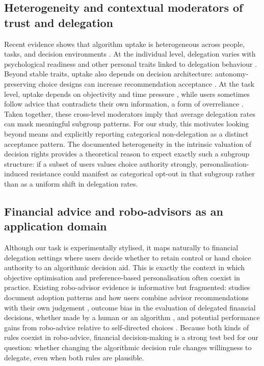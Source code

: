 \documentclass[a4paper, 12pt, fleqn]{article}
\theoremstyle{hypstyle}
\begin{document}
\subsection{Heterogeneity and contextual moderators of trust and delegation}
Recent evidence shows that algorithm uptake is heterogeneous across people, tasks, and decision environments \citep{Ferraz2025,Yang2025}. At the individual level, delegation varies with psychological readiness and other personal traits linked to delegation behaviour \citep{Kim2026,Ferraz2025}. Beyond stable traits, uptake also depends on decision architecture: autonomy-preserving choice designs can increase recommendation acceptance \citep{Fink2024}. At the task level, uptake depends on objectivity and time pressure \citep{Yang2025}, while users sometimes follow advice that contradicts their own information, a form of overreliance \citep{Klingbeil2024}. Taken together, these cross-level moderators imply that average delegation rates can mask meaningful subgroup patterns. For our study, this motivates looking beyond means and explicitly reporting categorical non-delegation as a distinct acceptance pattern. The documented heterogeneity in the intrinsic valuation of decision rights \citep{Bartling2014,Owens2014} provides a theoretical reason to expect exactly such a subgroup structure: if a subset of users values choice authority strongly, personalisation-induced resistance could manifest as categorical opt-out in that subgroup rather than as a uniform shift in delegation rates.

\subsection{Financial advice and robo-advisors as an application domain}
Although our task is experimentally stylised, it maps naturally to financial delegation settings where users decide whether to retain control or hand choice authority to an algorithmic decision aid. This is exactly the context in which objective optimisation and preference-based personalisation often coexist in practice. Existing robo-advisor evidence is informative but fragmented: studies document adoption patterns and how users combine advisor recommendations with their own judgement \citep{Figa-Talamanca2022,Mahmud2025}, outcome bias in the evaluation of delegated financial decisions, whether made by a human or an algorithm \citep{Ismagilova2025}, and potential performance gains from robo-advice relative to self-directed choices \citep{Lambrecht2023}. 
Because both kinds of rules coexist in robo-advice, financial decision-making is a strong test bed for our question: whether changing the algorithmic decision rule changes willingness to delegate, even when both rules are plausible.
\end{document}
